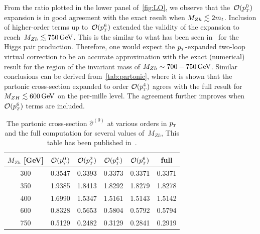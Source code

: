 \par From the ratio plotted in the lower panel of~\autoref{fig:LO}, we observe that the~$\mathcal{O}(p_{\scriptscriptstyle T}^0)$ expansion is in good agreement with the exact result when $M_{Zh}\lesssim 2m_t$. Inclusion of higher-order terms up to~$\mathcal{O}(p_{\scriptscriptstyle T}^6)$ extended the validity of the expansion to reach~$M_{Zh}\lesssim 750\,\textrm{GeV}$. This is the similar to what has been seen in~\cite{Bonciani:2018omm} for the Higgs pair production. Therefore, one would expect the $p_{\scriptscriptstyle T}$-expanded two-loop virtual correction to be an accurate approximation with the exact (numerical) result for the region of the invariant mass of  $M_{Zh}\sim 700-750\,\textrm{GeV}$. 
Similar conclusions can be derived from~\autoref{tab:partonic}, where it is shown that the partonic cross-section
expanded to order $\mathcal{O}(p_{\scriptscriptstyle T}^4)$ agrees with the full result for
$M_{ZH} \lesssim 600 \,\textrm{GeV}$  on the per-mille level.
The agreement further improves when $\mathcal{O}(p_{\scriptscriptstyle T}^6)$ terms are included.
\begin{table}
	\renewcommand{\arraystretch}{1.2}
	\centering
	\begin{tabular}{| c| c | c | c| c| c|} \hline
		\rowcolor{lightgray}  $M_{Zh}$ [GeV]  & $\mathcal{O}(p_{\scriptscriptstyle T}^0)$ & $\mathcal{O}(p_{\scriptscriptstyle T}^2)$ & $\mathcal{O}(p_{\scriptscriptstyle T}^4)$ & $\mathcal{O}(p_{\scriptscriptstyle T}^6)$ & full \\ \hline 
		\cellcolor{lightgray} 300 & 0.3547 & 0.3393 &  0.3373 &0.3371& 0.3371 \\
		\cellcolor{lightgray} 350 & 1.9385 & 1.8413& 1.8292 &1.8279& 1.8278 \\
		\cellcolor{lightgray} 400 & 1.6990 & 1.5347 & 1.5161 &1.5143& 1.5142 \\
		\cellcolor{lightgray} 600 & 0.8328 & 0.5653 & 0.5804 &0.5792&  0.5794 \\ 
		\cellcolor{lightgray} 750 & 0.5129 & 0.2482 & 0.3129 & 0.2841 &  0.2919 \\ \hline
	\end{tabular}
	\caption{The partonic cross-section $\hat{\sigma}^{(0)}$ at
		various orders in $p_{\scriptscriptstyle T}$ and the full computation for several values of~$M_{Zh}$, This table has been published in~\cite{Alasfar:2021ppe}. \label{tab:partonic}}
\end{table}
